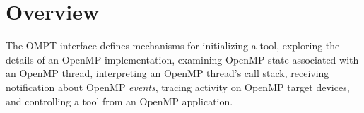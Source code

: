 %
%
%
%
%
%
%
%
%
%
%
%
%


\section{Overview}
\label{sec:ompt-overview}

The OMPT interface defines mechanisms for initializing a tool,
exploring the details of an OpenMP implementation, examining OpenMP state
associated with an OpenMP thread, interpreting an OpenMP thread's call stack,
receiving notification about OpenMP \emph{events}, tracing activity on 
OpenMP target devices, and controlling a tool from an OpenMP application.

